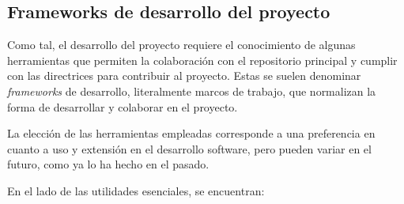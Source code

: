 \subsection{Frameworks de desarrollo del proyecto} \label{sct:pvlib:dev}

Como tal, el desarrollo del proyecto requiere el conocimiento de algunas herramientas que permiten la colaboración con el repositorio principal y cumplir con las directrices para contribuir al proyecto. Estas se suelen denominar \textit{frameworks} de desarrollo, literalmente marcos de trabajo, que normalizan la forma de desarrollar y colaborar en el proyecto.

La elección de las herramientas empleadas corresponde a una preferencia en cuanto a uso y extensión en el desarrollo software, pero pueden variar en el futuro, como ya lo ha hecho en el pasado.

En el lado de las utilidades esenciales, se encuentran:


